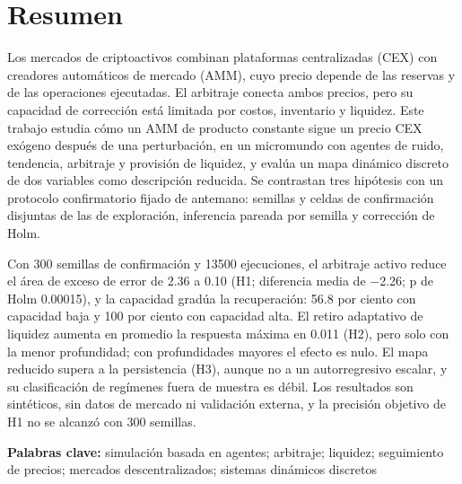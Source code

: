 \section{Resumen}

Los mercados de criptoactivos combinan plataformas centralizadas (CEX) con creadores automáticos de mercado (AMM), cuyo precio depende de las reservas y de las operaciones ejecutadas. El arbitraje conecta ambos precios, pero su capacidad de corrección está limitada por costos, inventario y liquidez. Este trabajo estudia cómo un AMM de producto constante sigue un precio CEX exógeno después de una perturbación, en un micromundo con agentes de ruido, tendencia, arbitraje y provisión de liquidez, y evalúa un mapa dinámico discreto de dos variables como descripción reducida. Se contrastan tres hipótesis con un protocolo confirmatorio fijado de antemano: semillas y celdas de confirmación disjuntas de las de exploración, inferencia pareada por semilla y corrección de Holm.

Con 300 semillas de confirmación y 13500 ejecuciones, el arbitraje activo reduce el área de exceso de error de 2.36 a 0.10 (H1; diferencia media de −2.26; p de Holm 0.00015), y la capacidad gradúa la recuperación: 56.8 por ciento con capacidad baja y 100 por ciento con capacidad alta. El retiro adaptativo de liquidez aumenta en promedio la respuesta máxima en 0.011 (H2), pero solo con la menor profundidad; con profundidades mayores el efecto es nulo. El mapa reducido supera a la persistencia (H3), aunque no a un autorregresivo escalar, y su clasificación de regímenes fuera de muestra es débil. Los resultados son sintéticos, sin datos de mercado ni validación externa, y la precisión objetivo de H1 no se alcanzó con 300 semillas.

\textbf{Palabras clave:} simulación basada en agentes; arbitraje; liquidez; seguimiento de precios; mercados descentralizados; sistemas dinámicos discretos
